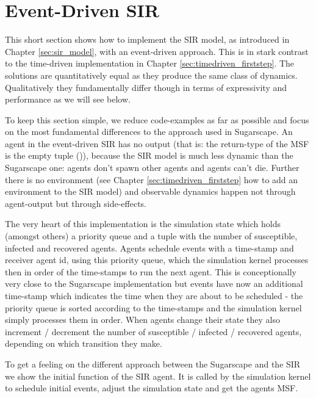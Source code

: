\section{Event-Driven SIR}
\label{sec:eventdriven_sir}
This short section shows how to implement the SIR model, as introduced in Chapter \ref{sec:sir_model}, with an event-driven approach. This is in stark contrast to the time-driven implementation in Chapter \ref{sec:timedriven_firststep}. The solutions are quantitatively equal as they produce the same class of dynamics. Qualitatively they fundamentally differ though in terms of expressivity and performance as we will see below.

To keep this section simple, we reduce code-examples as far as possible and focus on the most fundamental differences to the approach used in Sugarscape. An agent in the event-driven SIR has no output (that is: the return-type of the MSF is the empty tuple ()), because the SIR model is much less dynamic than the Sugarscape one: agents don't spawn other agents and agents can't die. Further there is no environment (see Chapter \ref{sec:timedriven_firststep} how to add an environment to the SIR model) and observable dynamics happen not through agent-output but through side-effects.

The very heart of this implementation is the simulation state which holds (amongst others) a priority queue and a tuple with the number of susceptible, infected and recovered agents. Agents schedule events with a time-stamp and receiver agent id, using this priority queue, which the simulation kernel processes then in order of the time-stamps to run the next agent. This is conceptionally very close to the Sugarscape implementation but events have now an additional time-stamp which indicates the time when they are about to be scheduled - the priority queue is sorted according to the time-stamps and the simulation kernel simply processes them in order. When agents change their state they also increment / decrement the number of susceptible / infected / recovered agents, depending on which transition they make.

To get a feeling on the different approach between the Sugarscape and the SIR we show the initial function of the SIR agent. It is called by the simulation kernel to schedule initial events, adjust the simulation state and get the agents MSF.

